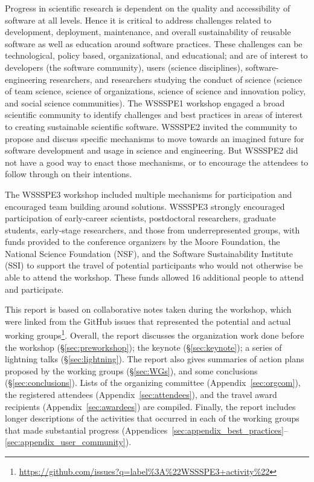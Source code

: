 \documentclass[11pt, oneside]{amsart}
\begin{document}
Progress in scientific research is dependent on the quality and accessibility of
software at all levels. Hence it is critical to address challenges related to
development, deployment, maintenance, and overall sustainability of reusable
software as well as education around software practices. These challenges can be
technological, policy based, organizational, and educational; and are of
interest to developers (the software community), users (science disciplines),
software-engineering researchers, and researchers studying the conduct of
science (science of team science, science of organizations, science of science
and innovation policy, and social science communities). The WSSSPE1 workshop
engaged a broad scientific community to identify challenges and best practices
in areas of interest to creating sustainable scientific software. WSSSPE2
invited the community to propose and discuss specific mechanisms to move towards
an imagined future for software development and usage in science and
engineering. But WSSSPE2 did not have a good way to enact those mechanisms, or to
encourage the attendees to follow through on their intentions.

The WSSSPE3 workshop included multiple mechanisms for participation and
encouraged team building around solutions. WSSSPE3 strongly encouraged participation
of early-career scientists, postdoctoral researchers, graduate students,  
early-stage researchers, and those from underrepresented groups,
with funds provided to the conference organizers by the Moore Foundation, the
National Science Foundation (NSF), and the Software Sustainability Institute (SSI) to
support the travel of potential participants who would not otherwise be able to
attend the workshop. These
funds allowed 16 additional people to attend and participate.

This report is based on collaborative notes taken during the workshop, which
were linked from the GitHub issues that represented the potential and actual
working
groups\footnote{\url{https://github.com/issues?q=label\%3A\%22WSSSPE3+activity\%22}}.
Overall, the report discusses the organization work done before the workshop
(\S\ref{sec:preworkshop}); the keynote (\S\ref{sec:keynote}); a series of
lightning talks (\S\ref{sec:lightning}). The report also gives summaries of
action plans proposed by the working groups (\S\ref{sec:WGs}), and some
conclusions (\S\ref{sec:conclusions}). Lists of the organizing committee
(Appendix~\ref{sec:orgcom}), the registered attendees
(Appendix~\ref{sec:attendees}), and the travel award recipients
(Appendix~\ref{sec:awardees}) are compiled. Finally, the report includes longer
descriptions of the activities that occurred in each of the working groups that
made substantial progress
(Appendices~\ref{sec:appendix_best_practices}--\ref{sec:appendix_user_community}).
\end{document}
